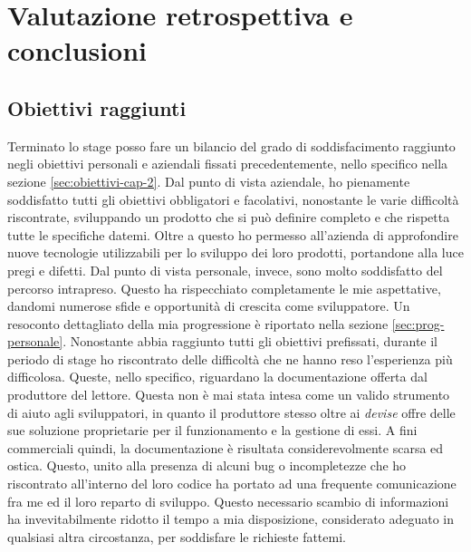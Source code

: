 
\chapter{Valutazione retrospettiva e conclusioni}
\label{cap:conclusioni}


\section{Obiettivi raggiunti}
Terminato lo stage posso fare un bilancio del grado di soddisfacimento raggiunto negli obiettivi 
personali e aziendali fissati precedentemente, nello specifico nella sezione \ref{sec:obiettivi-cap-2}.
Dal punto di vista aziendale, ho pienamente soddisfatto tutti gli obiettivi obbligatori e facolativi, nonostante le varie difficoltà riscontrate,
sviluppando un prodotto che si può definire completo e che rispetta tutte le specifiche datemi. Oltre a questo ho permesso all'azienda
di approfondire nuove tecnologie utilizzabili per lo sviluppo dei loro prodotti, portandone alla luce pregi e difetti.
Dal punto di vista personale, invece, sono molto soddisfatto del percorso intrapreso. Questo ha rispecchiato completamente le mie
aspettative, dandomi numerose sfide e opportunità di crescita come sviluppatore. Un resoconto  dettagliato della mia progressione
è riportato nella sezione \ref{sec:prog-personale}.
Nonostante abbia raggiunto tutti gli obiettivi prefissati, durante il periodo di stage ho riscontrato delle difficoltà che ne hanno reso
l'esperienza più difficolosa. Queste, nello specifico, riguardano la documentazione offerta dal produttore del lettore. 
Questa non è mai stata intesa come un valido strumento di aiuto agli sviluppatori,
in quanto il produttore stesso oltre ai \emph{devise} offre delle sue soluzione proprietarie per il funzionamento e la gestione di essi.
A fini commerciali quindi, la documentazione è risultata considerevolmente scarsa ed ostica.
Questo, unito alla presenza di alcuni bug o incompletezze che ho riscontrato all'interno del loro codice ha portato ad una frequente comunicazione fra me ed il loro reparto di sviluppo.
Questo necessario scambio di informazioni ha invevitabilmente ridotto il tempo a mia disposizione, considerato adeguato in qualsiasi altra circostanza, per soddisfare le richieste fattemi.

